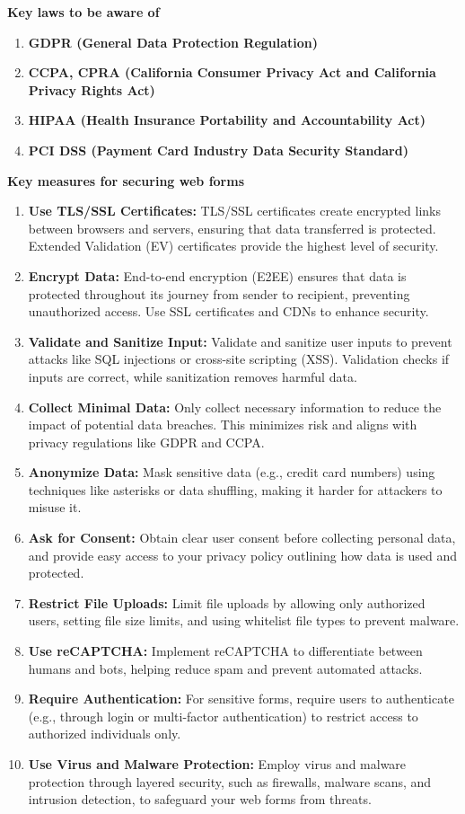 \documentclass[12pt,oneside,openright,a4paper]{cpe-english-project}
\begin{document}
\textbf{Key laws to be aware of}
\begin{enumerate}
	\item \textbf{GDPR (General Data Protection Regulation)}
	\item \textbf{CCPA, CPRA (California Consumer Privacy Act and California Privacy Rights Act)}
	\item \textbf{HIPAA (Health Insurance Portability and Accountability Act)}
	\item \textbf{PCI DSS (Payment Card Industry Data Security Standard)}
\end{enumerate}
\newpage %
\textbf{Key measures for securing web forms}
\begin{enumerate}
	\item \textbf{Use TLS/SSL Certificates:} TLS/SSL certificates create encrypted links between browsers and servers, ensuring that data transferred is protected. Extended Validation (EV) certificates provide the highest level of security.
	\item \textbf{Encrypt Data:} End-to-end encryption (E2EE) ensures that data is protected throughout its journey from sender to recipient, preventing unauthorized access. Use SSL certificates and CDNs to enhance security.
	\item \textbf{Validate and Sanitize Input:} Validate and sanitize user inputs to prevent attacks like SQL injections or cross-site scripting (XSS). Validation checks if inputs are correct, while sanitization removes harmful data.
	\item \textbf{Collect Minimal Data:} Only collect necessary information to reduce the impact of potential data breaches. This minimizes risk and aligns with privacy regulations like GDPR and CCPA.
	\item \textbf{Anonymize Data:} Mask sensitive data (e.g., credit card numbers) using techniques like asterisks or data shuffling, making it harder for attackers to misuse it.
	\item \textbf{Ask for Consent:} Obtain clear user consent before collecting personal data, and provide easy access to your privacy policy outlining how data is used and protected.
	\item \textbf{Restrict File Uploads:} Limit file uploads by allowing only authorized users, setting file size limits, and using whitelist file types to prevent malware.
	\item \textbf{Use reCAPTCHA:} Implement reCAPTCHA to differentiate between humans and bots, helping reduce spam and prevent automated attacks.
	\item \textbf{Require Authentication:} For sensitive forms, require users to authenticate (e.g., through login or multi-factor authentication) to restrict access to authorized individuals only.
	\item \textbf{Use Virus and Malware Protection:} Employ virus and malware protection through layered security, such as firewalls, malware scans, and intrusion detection, to safeguard your web forms from threats.
\end{enumerate}
\end{document}
